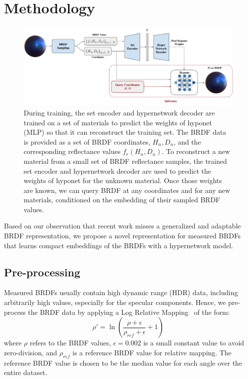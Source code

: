 \section{Methodology}

\begin{figure}[t]
  \centering

   \includegraphics[width=\linewidth]{Chapters/hyperbrdf-figs/MainFig_13_11.pdf}
   \caption{During training, the set encoder and hypernetwork decoder are trained on a set of materials to predict the weights of hyponet (MLP) so that it can reconstruct the training set. The BRDF data is provided as a set of BRDF coordinates, $H_n,D_n$, and the corresponding reflectance values $f_r(H_n,D_n)$. To reconstruct a new material from a small set of BRDF reflectance samples, the trained set encoder and hypernetwork decoder are used to predict the weights of hyponet for the unknown material. Once those weights are known, we can query BRDF at any coordinates and for any new materials, conditioned on the embedding of their sampled BRDF values.}
   \label{fig:mainfig} \end{figure}

Based on our observation that recent work misses a generalized and adaptable BRDF representation, we propose a novel representation for measured BRDFs that learns compact embeddings of the BRDFs with a hypernetwork model.

\subsection{Pre-processing}\label{sec:pre-proc}

Measured BRDFs usually contain high dynamic range (HDR) data, including arbitrarily high values, especially for the specular components. Hence, we pre-process the BRDF data by applying a Log Relative Mapping~\cite{nielsen2015optimal} of the form:
\begin{equation}
  \rho' = \ln{\left(\frac{\rho + \epsilon}{\rho_{ref} + \epsilon} +1\right)}
  \label{eq:preprocess}
\end{equation}
where $\rho$ refers to the BRDF values, $\epsilon = 0.002$ is a small constant value to avoid zero-division, and $\rho_{ref}$ is a reference BRDF value for relative mapping. The reference BRDF value is chosen to be the median value for each angle over the entire dataset.


